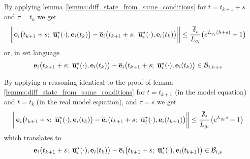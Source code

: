 \begin{gg_box}

By applying lemma \eqref{lemma:diff_state_from_same_conditions} for
$t=t_{k+1} + s$ and $\tau=t_k$ we get
\begin{align}
    \bigg\|
      \vect{e}_i\big(t_{k+1}+s;\  \overline{\vect{u}}_i^{\star}(\cdot), \vect{e}_i(t_k)\big)
      -\overline{\vect{e}}_i\big(t_{k+1} + s;\ \overline{\vect{u}}_i^{\star}(\cdot), \vect{e}_i(t_k)\big)
    \bigg\|
    \leq \dfrac{\overline{\delta}_i}{L_{g_i}}\big(e^{L_{g_i} (h+s)}-1\big)
\end{align}
or, in set language
\begin{align}
      \vect{e}_i\big(t_{k+1}+s;\  \overline{\vect{u}}_i^{\star}(\cdot), \vect{e}_i(t_k)\big)
      -\overline{\vect{e}}_i\big(t_{k+1} + s;\ \overline{\vect{u}}_i^{\star}(\cdot), \vect{e}_i(t_k)\big)
      \in \mathcal{B}_{i, h+s}
\end{align}

By applying a reasoning identical to the proof of lemma
\eqref{lemma:diff_state_from_same_conditions} for $t=t_{k+1}$ (in the model
equation) and $t = t_k$ (in the real model equation), and $\tau = s$ we get
\begin{align}
    \bigg\|
      \vect{e}_i\big(t_{k+1}+s;\  \overline{\vect{u}}_i^{\star}(\cdot), \vect{e}_i(t_k)\big)
      -\overline{\vect{e}}_i\big(t_{k+1} + s;\ \overline{\vect{u}}_i^{\star}(\cdot), \vect{e}_i(t_{k+1})\big)
    \bigg\|
  \leq \dfrac{\overline{\delta}_i}{L_{g_i}}\big(e^{L_{g_i} s}-1\big)
\end{align}
which translates to
\begin{align}
      \vect{e}_i\big(t_{k+1}+s;\  \overline{\vect{u}}_i^{\star}(\cdot), \vect{e}_i(t_k)\big)
      -\overline{\vect{e}}_i\big(t_{k+1} + s;\ \overline{\vect{u}}_i^{\star}(\cdot), \vect{e}_i(t_{k+1})\big)
      \in \mathcal{B}_{i,s}
\end{align}


\end{gg_box}

